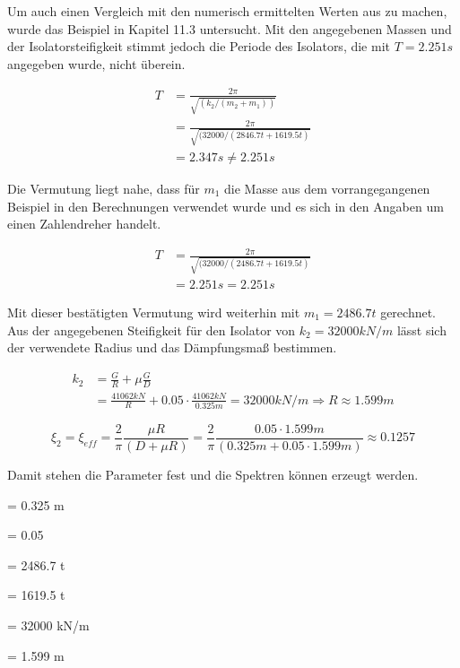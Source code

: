 Um auch einen Vergleich mit den numerisch ermittelten Werten aus \cite{Isemann} zu machen, wurde das Beispiel in Kapitel 11.3 untersucht.
Mit den angegebenen Massen und der Isolatorsteifigkeit stimmt jedoch die Periode des Isolators, die mit $T = 2.251 s$ angegeben wurde, nicht überein.

\begin{align*}
T &= \frac{2 \pi}{\sqrt{(k_2/(m_2+m_1))}}\\
  &= \frac{2 \pi}{\sqrt{(32000/( 2846.7 t + 1619.5 t)}}\\
  &= 2.347 s \neq 2.251 s
\end{align*}

Die Vermutung liegt nahe, dass für $m_1$ die Masse aus dem vorrangegangenen Beispiel in den Berechnungen verwendet wurde und es sich in den Angaben um einen \glqq Zahlendreher\grqq{} handelt.

\begin{align*}
T &= \frac{2 \pi}{\sqrt{(32000/( 2486.7 t + 1619.5 t)}}\\
  &= 2.251 s = 2.251 s
\end{align*}

Mit dieser bestätigten Vermutung wird weiterhin mit $m_1 = 2486.7 t$ gerechnet.
Aus der angegebenen Steifigkeit für den Isolator von $k_2 = 32000 kN/m$ lässt sich der verwendete Radius und das Dämpfungsmaß bestimmen.

\begin{align*}
k_2 &= \frac{G}{R} + \mu \frac{G}{D}\\
    &= \frac{41062 kN}{R} + 0.05 \cdot \frac{41062 kN}{0.325 m} = 32000 kN/m \Rightarrow R \approx 1.599 m
\end{align*}

\begin{equation*}
\xi_2 = \xi_{eff} = \frac{2}{\pi} \frac{\mu R}{(D + \mu R)} = \frac{2}{\pi} \frac{0.05 \cdot 1.599 m}{(0.325 m + 0.05 \cdot 1.599 m)} \approx 0.1257
\end{equation*} 

\pagebreak

Damit stehen die Parameter fest und die Spektren können erzeugt werden.

    = 0.325 m \par
\makebox[1cm]{$\mu$}  = 0.05\par
{}  = 2486.7 t\par
{}  = 1619.5 t\par
{}  = 32000 kN/m \par
{}    = 1.599 m\par

